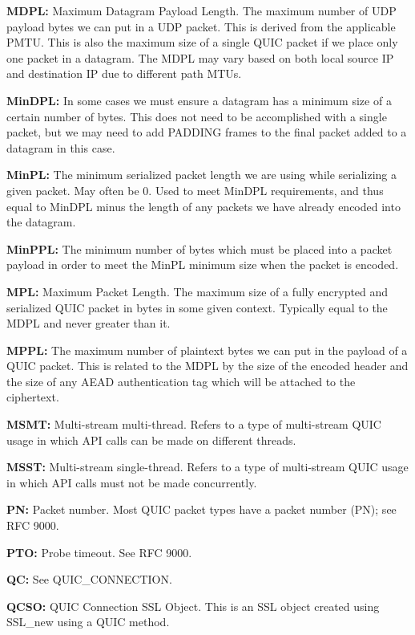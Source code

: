 {\bfseries{MDPL\+:}} Maximum Datagram Payload Length. The maximum number of UDP payload bytes we can put in a UDP packet. This is derived from the applicable PMTU. This is also the maximum size of a single QUIC packet if we place only one packet in a datagram. The MDPL may vary based on both local source IP and destination IP due to different path MTUs.

{\bfseries{Min\+DPL\+:}} In some cases we must ensure a datagram has a minimum size of a certain number of bytes. This does not need to be accomplished with a single packet, but we may need to add PADDING frames to the final packet added to a datagram in this case.

{\bfseries{Min\+PL\+:}} The minimum serialized packet length we are using while serializing a given packet. May often be 0. Used to meet Min\+DPL requirements, and thus equal to Min\+DPL minus the length of any packets we have already encoded into the datagram.

{\bfseries{Min\+PPL\+:}} The minimum number of bytes which must be placed into a packet payload in order to meet the Min\+PL minimum size when the packet is encoded.

{\bfseries{MPL\+:}} Maximum Packet Length. The maximum size of a fully encrypted and serialized QUIC packet in bytes in some given context. Typically equal to the MDPL and never greater than it.

{\bfseries{MPPL\+:}} The maximum number of plaintext bytes we can put in the payload of a QUIC packet. This is related to the MDPL by the size of the encoded header and the size of any AEAD authentication tag which will be attached to the ciphertext.

{\bfseries{MSMT\+:}} Multi-\/stream multi-\/thread. Refers to a type of multi-\/stream QUIC usage in which API calls can be made on different threads.

{\bfseries{MSST\+:}} Multi-\/stream single-\/thread. Refers to a type of multi-\/stream QUIC usage in which API calls must not be made concurrently.

{\bfseries{PN\+:}} Packet number. Most QUIC packet types have a packet number (PN); see RFC 9000.

{\bfseries{PTO\+:}} Probe timeout. See RFC 9000.

{\bfseries{QC\+:}} See {\ttfamily QUIC\+\_\+\+CONNECTION}.

{\bfseries{QCSO\+:}} QUIC Connection SSL Object. This is an SSL object created using {\ttfamily SSL\+\_\+new} using a QUIC method.

